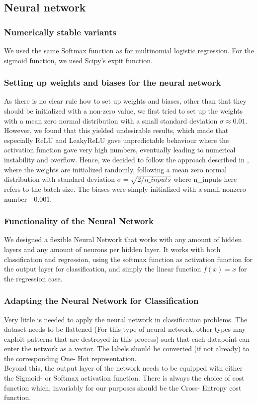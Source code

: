 \documentclass[11pt,a4paper,titlepage]{article}
\begin{document}
\subsection{Neural network}
\subsubsection{Numerically stable variants}
We used the same Softmax function as for multinomial logistic regression. For the sigmoid function, we used Scipy's \citep{SciPy} expit function.
\subsubsection{Setting up weights and biases for the neural network}
As there is no clear rule how to set up weights and biases, other than that they should be initialized with a non-zero value, we first tried to set up the weights with a mean zero normal distribution with a small standard deviation $\sigma\approx0.01$. However, we found that this yielded undesirable results, which made that especially ReLU and LeakyReLU gave unpredictable behaviour where the activation function gave very high numbers, eventually leading to numerical instability and overflow. Hence, we decided to follow the approach described in \cite{DelvingDeep}, where the weights are initialized randomly, following a mean zero normal distribution with standard deviation $\sigma=\sqrt{2/n\_inputs}$ where n\_inputs here refers to the batch size. The biases were simply initialized with a small nonzero number - $0.001$.
\subsubsection{Functionality of the Neural Network}
We designed a flexible Neural Network that works with any amount of hidden layers and any amount of neurons per hidden layer. It works with both classification and regression, using the softmax function as activation function for the output layer for classification, and simply the linear function $f(x)=x$ for the regression case. 
\subsubsection{Adapting the Neural Network for Classification}
Very little is needed to apply the neural network in classification problems. The dataset needs to be flattened (For this type of neural network, other types may exploit patterns that are destroyed in this process) such that each datapoint can enter the network as a vector. The labels should be converted (if not already) to the corresponding One- Hot representation.\\Beyond this, the output layer of the network needs to be equipped with either the Sigmoid- or Softmax activation function. There is always the choice of cost function which, invariably for our purposes should be the Cross- Entropy cost function.
\end{document}
